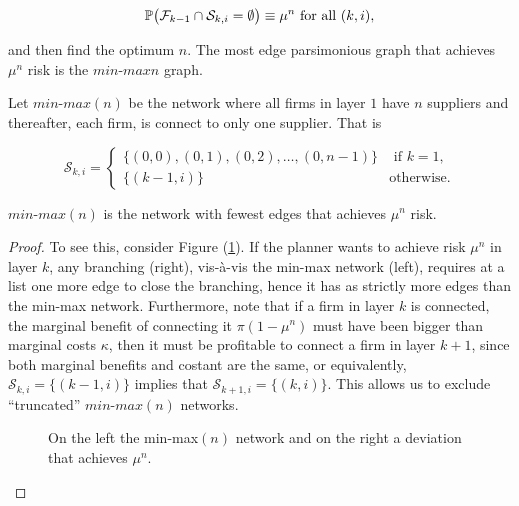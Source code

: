 \documentclass[../../main.tex]{subfiles}
\begin{document}
\begin{equation}
  \P\big( \mathcal{F}_{k - 1} \cap \mathcal{S}_{k, i} = \emptyset \big) \equiv  \mu^n \text{ for all } (k, i),
\end{equation}

and then find the optimum $n$. The most edge parsimonious graph that achieves $\mu^n$ risk is the $\textit{min-max}n$ graph.

\begin{definition}
  Let $\textit{min-max}(n)$ be the network where all firms in layer $1$ have $n$ suppliers and thereafter, each firm, is connect to only one supplier. That is
  
  \begin{equation}
    \mathcal{S}_{k, i} = \begin{cases}
      \{(0, 0), (0, 1), (0, 2), \ldots, (0, n - 1)\} &\text{ if } k = 1,\\
      \{(k - 1, i)\} &\text{otherwise.}
    \end{cases}
  \end{equation}
\end{definition}

\begin{lemma}
  $\textit{min-max}(n)$ is the network with fewest edges that achieves $\mu^n$ risk.
\end{lemma}

\begin{proof}

To see this, consider Figure (\ref{fig:planner-n-target}). If the planner wants to achieve risk $\mu^n$ in layer $k$, any branching (right), vis-à-vis the min-max network (left), requires at a list one more edge to close the branching, hence it has as strictly more edges than the min-max network. Furthermore, note that if a firm in layer $k$ is connected, the marginal benefit of connecting it $\pi (1 - \mu^n)$ must have been bigger than marginal costs $\kappa$, then it must be profitable to connect a firm in layer $k + 1$, since both marginal benefits and costant are the same, or equivalently, $\mathcal{S}_{k, i} = \{(k-1, i)\}$ implies that $\mathcal{S}_{k + 1, i} = \{(k, i)\}$. This allows us to exclude ``truncated'' $\textit{min-max}(n)$ networks.

\begin{figure}[H]
  \centering
  \begin{subfigure}{.5\textwidth}
    \centering
  \end{subfigure}%
  \begin{subfigure}{.5\textwidth}
    \centering
  \end{subfigure}%
  \caption{On the left the min-max$(n)$ network and on the right a deviation that achieves $\mu^n$.}
  \label{fig:planner-n-target}
\end{figure}

\end{proof}
\end{document}
